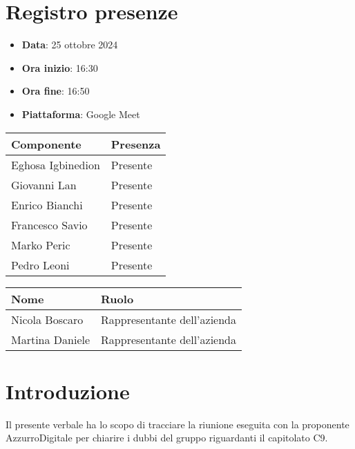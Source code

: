 \documentclass[a4paper, 12pt]{article}
\begin{document}
\section{Registro presenze}
\begin{itemize}
    \item[] \textbf{Data}: 25 ottobre 2024
    \item[] \textbf{Ora inizio}:  16:30
    \item[] \textbf{Ora fine}: 16:50
    \item[] \textbf{Piattaforma}: Google Meet	
\end{itemize}
\begin{table}[!h]
\centering
{\renewcommand{\arraystretch}{2}
\begin{tabularx}{\textwidth}{| X | X |}
    \hline
        \textbf{\large Componente} & 
        \textbf{\large Presenza} \\ 
    \hline 
    \hline
        Eghosa Igbinedion&
        Presente \\
    \hline 
        Giovanni Lan&
        Presente \\
    \hline 
        Enrico Bianchi&
        Presente \\
    \hline 
        Francesco Savio&
        Presente \\
    \hline 
        Marko Peric&
        Presente \\
    \hline 
        Pedro Leoni&
        Presente \\
    \hline 

\end{tabularx}}
\end{table}

\begin{table}[!h]
    \centering
    {\renewcommand{\arraystretch}{2}
    \begin{tabularx}{\textwidth}{| X | X |}
        \hline
            \textbf{\large Nome} & 
            \textbf{\large Ruolo} \\ 
        \hline 
        \hline
            Nicola Boscaro&
            Rappresentante dell'azienda \\
        \hline 
            Martina Daniele&
            Rappresentante dell'azienda \\
        \hline 
    
    \end{tabularx}}
\end{table}

\newpage

\section{Introduzione}
Il presente verbale ha lo scopo di tracciare la riunione eseguita con la proponente AzzurroDigitale per chiarire i dubbi del gruppo riguardanti il capitolato C9.
\end{document}
